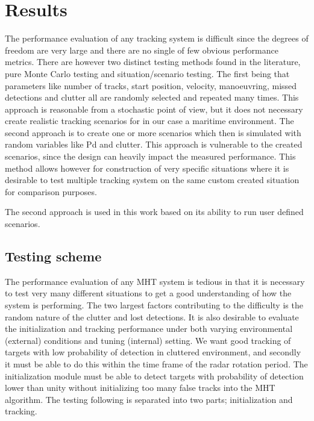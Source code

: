 \chapter{Results}\label{chapter:results}
The performance evaluation of any tracking system is difficult since the degrees of freedom are very large and there are no single of few obvious performance metrics. There are however two distinct testing methods found in the literature, pure Monte Carlo testing and situation/scenario testing. The first being that parameters like number of tracks, start position, velocity, manoeuvring, missed detections and clutter all are randomly selected and repeated many times. This approach is reasonable from a stochastic point of view, but it does not necessary create realistic tracking scenarios for in our case a maritime environment. The second approach is to create one or more scenarios which then is simulated with random variables like \gls{Pd} and clutter. This approach is vulnerable to the created scenarios, since the design can heavily impact the measured performance. This method allows however for construction of very specific situations where it is desirable to test multiple tracking system on the same custom created situation for comparison purposes.

The second approach is used in this work based on its ability to run user defined scenarios.

\section{Testing scheme}
The performance evaluation of any MHT system is tedious in that it is necessary to test very many different situations to get a good understanding of how the system is performing. The two largest factors contributing to the difficulty is the random nature of the clutter and lost detections. It is also desirable to evaluate the initialization and tracking performance under both varying environmental (external) conditions and tuning (internal) setting. We want good tracking of targets with low probability of detection in cluttered environment, and secondly it must be able to do this within the time frame of the radar rotation period. The initialization module must be able to detect targets with probability of detection lower than unity without initializing too many false tracks into the MHT algorithm. The testing following is separated into two parts; initialization and tracking.

